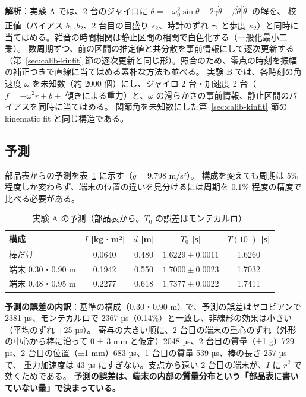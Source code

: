 \documentclass[paper=a4paper,fontsize=10pt,twocolumn,column_gap=2zw,line_length=24zw,number_of_lines=46,head_space=20mm]{jlreq}
\begin{document}
\textbf{解析}：実験 A では、2 台のジャイロに $\ddot\theta = -\omega_0^2\sin\theta - 2\gamma\dot\theta - \beta\dot\theta|\dot\theta|$ の解を、
校正値（バイアス $b_1, b_2$、2 台目の目盛り $s_2$、時計のずれ $\tau_2$ と歩度 $\kappa_2$）と同時に当てはめる。雑音の時間相関は静止区間の相関で白色化する（一般化最小二乗）。
数周期ずつ、前の区間の推定値と共分散を事前情報にして逐次更新する（第~\ref{sec:calib-kinfit} 節の逐次更新と同じ形）。照合のため、零点の時刻を振幅の補正つきで直線に当てはめる素朴な方法も並べる。
実験 B では、各時刻の角速度 $\omega$ を未知数（約 2000 個）にし、ジャイロ 2 台・加速度 2 台（$f=-\omega^2 r + b + $ 傾きによる重力）と、$\omega$ の滑らかさの事前情報、静止区間のバイアスを同時に当てはめる。
関節角を未知数にした第~\ref{sec:calib-kinfit} 節の kinematic fit と同じ構造である。

\subsection{予測}

部品表からの予測を表~\ref{tab:bgpred} に示す（$g=9.798$ m/s²）。
構成を変えても周期は 5\% 程度しか変わらず、端末の位置の違いを見分けるには周期を 0.1\% 程度の精度で比べる必要がある。

\begin{table}[t]\centering\footnotesize
\caption{実験 A の予測（部品表から。$T_0$ の誤差はモンテカルロ）}\label{tab:bgpred}
\setlength{\tabcolsep}{2pt}
\begin{tabular}{lcccc}\toprule
構成 & $I$ [kg·m²] & $d$ [m] & $T_0$ [s] & $T(10^\circ)$ [s] \\\midrule
棒だけ & 0.0640 & 0.480 & $1.6229\pm0.0011$ & 1.6260 \\
端末 0.30・0.90 m & 0.1942 & 0.550 & $1.7000\pm0.0023$ & 1.7032 \\
端末 0.48・0.95 m & 0.2277 & 0.618 & $1.7377\pm0.0022$ & 1.7411 \\\bottomrule
\end{tabular}
\end{table}

\textbf{予測の誤差の内訳}：基準の構成（0.30・0.90 m）で、予測の誤差はヤコビアンで 2381 µs、モンテカルロで 2367 µs（0.14\%）と一致し、非線形の効果は小さい（平均のずれ +25 µs）。
寄与の大きい順に、2 台目の端末の重心のずれ（外形の中心から棒に沿って 0 ± 3 mm と仮定）2048 µs、2 台目の質量（±1 g）729 µs、2 台目の位置（±1 mm）683 µs、1 台目の質量 539 µs、棒の長さ 257 µs で、
重力加速度は 43 µs にすぎない。支点から遠い 2 台目の端末が、$I$ に $r^2$ で効くためである。
\textbf{予測の誤差は、端末の内部の質量分布という「部品表に書いていない量」で決まっている。}
\end{document}

